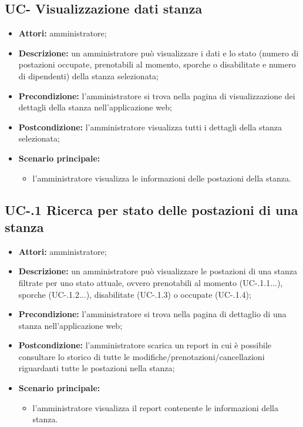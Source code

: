 \subsection{UC- Visualizzazione dati stanza}
\begin{itemize}
    \item \textbf{Attori:} amministratore;
    \item \textbf{Descrizione:} un amministratore pu\`{o} visualizzare i dati e lo stato (numero di postazioni occupate, prenotabili al momento, sporche o disabilitate e numero di dipendenti) della stanza selezionata;
    \item \textbf{Precondizione:} l'amministratore si trova nella pagina di visualizzazione dei dettagli della stanza nell'applicazione web;
    \item \textbf{Postcondizione:} l'amministratore visualizza tutti i dettagli della stanza selezionata;
    \item \textbf{Scenario principale:}
    \begin{itemize}
        \item l'amministratore visualizza le informazioni delle postazioni della stanza.
    \end{itemize}
\end{itemize}

\subsection{UC-.1 Ricerca per stato delle postazioni di una stanza}
\begin{itemize}
    \item \textbf{Attori:} amministratore;
    \item \textbf{Descrizione:} un amministratore pu\`{o} visualizzare le postazioni di una stanza filtrate per uno stato attuale, ovvero prenotabili al momento (UC-.1.1...), sporche (UC-.1.2...), disabilitate (UC-.1.3) o occupate (UC-.1.4);
    \item \textbf{Precondizione:} l'amministratore si trova nella pagina di dettaglio di una stanza nell'applicazione web;
    \item \textbf{Postcondizione:} l'amministratore scarica un report in cui \`{e} possibile consultare lo storico di tutte le modifiche/prenotazioni/cancellazioni riguardanti tutte le postazioni nella stanza;
    \item \textbf{Scenario principale:}
    \begin{itemize}
        \item l'amministratore visualizza il report contenente le informazioni della stanza.
    \end{itemize}
\end{itemize}


